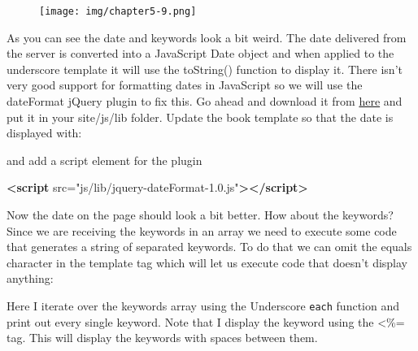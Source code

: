 \documentclass[9pt]{book}
\newenvironment{Shaded}{}{}
\newcommand{\KeywordTok}[1]{\textcolor[rgb]{0.00,0.44,0.13}{\textbf{{#1}}}}
\newcommand{\StringTok}[1]{\textcolor[rgb]{0.25,0.44,0.63}{{#1}}}
\newcommand{\OtherTok}[1]{\textcolor[rgb]{0.00,0.44,0.13}{{#1}}}
\newcommand{\ErrorTok}[1]{\textcolor[rgb]{1.00,0.00,0.00}{\textbf{{#1}}}}
\newcommand{\NormalTok}[1]{{#1}}
\begin{document}
\begin{figure}[htbp]
\centering
\texttt{[image: img/chapter5-9.png]}
\end{figure}

As you can see the date and keywords look a bit weird. The date
delivered from the server is converted into a JavaScript Date object and
when applied to the underscore template it will use the toString()
function to display it. There isn't very good support for formatting
dates in JavaScript so we will use the dateFormat jQuery plugin to fix
this. Go ahead and download it from
\href{http://github.com/phstc/jquery-dateFormat}{here} and put it in
your site/js/lib folder. Update the book template so that the date is
displayed with:

\begin{Shaded}
\end{Shaded}

and add a script element for the plugin

\begin{Shaded}
\begin{Highlighting}[]
\KeywordTok{<script}\OtherTok{ src=}\StringTok{"js/lib/jquery-dateFormat-1.0.js"}\KeywordTok{></script>}
\end{Highlighting}
\end{Shaded}

Now the date on the page should look a bit better. How about the
keywords? Since we are receiving the keywords in an array we need to
execute some code that generates a string of separated keywords. To do
that we can omit the equals character in the template tag which will let
us execute code that doesn't display anything:

\begin{Shaded}
\end{Shaded}

Here I iterate over the keywords array using the Underscore
\texttt{each} function and print out every single keyword. Note that I
display the keyword using the \textless{}\%= tag. This will display the
keywords with spaces between them.
\end{document}
